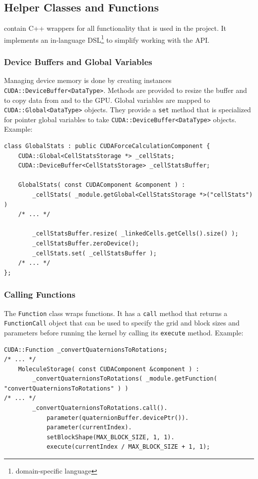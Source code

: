 \subsection{\cuda{} Helper Classes and Functions}
 contain C++ wrappers for all \cuda{} functionality that is used in the project.
It implements an in-language DSL\footnote{domain-specific language} to simplify working with the \cuda{} API.


\subsubsection{Device Buffers and Global Variables}
Managing device memory is done by creating instances \lstinline!CUDA::DeviceBuffer<DataType>!. Methods are provided to resize the buffer and to copy data from and to the GPU.
Global variables are mapped to \lstinline!CUDA::Global<DataType>! objects. They provide a \lstinline!set! method that is specialized for pointer global variables to take \lstinline!CUDA::DeviceBuffer<DataType>! objects.
Example:
\begin{lstlisting}[label=cudamemoryhelpers,caption=CUDA helper classes for Device Memory and Globals]
class GlobalStats : public CUDAForceCalculationComponent {
	CUDA::Global<CellStatsStorage *> _cellStats;
	CUDA::DeviceBuffer<CellStatsStorage> _cellStatsBuffer;
	
	GlobalStats( const CUDAComponent &component ) :
		_cellStats( _module.getGlobal<CellStatsStorage *>("cellStats") )
	/* ... */
	
		_cellStatsBuffer.resize( _linkedCells.getCells().size() );
		_cellStatsBuffer.zeroDevice();
		_cellStats.set( _cellStatsBuffer );		
	/* ... */		
};	
\end{lstlisting}

\subsubsection{Calling \cuda{} Functions}
The \lstinline!Function! class wraps \cuda{} functions. It has a \lstinline!call! method that returns a \lstinline!FunctionCall! object that can be used to specify the grid and block sizes and parameters before running the \cuda{} kernel by calling its \lstinline!execute! method.
Example:
\begin{lstlisting}[label=cudafunctionhelpers,caption=CUDA helper classes for Function Calls]
	CUDA::Function _convertQuaternionsToRotations;
/* ... */		
	MoleculeStorage( const CUDAComponent &component ) :
		_convertQuaternionsToRotations( _module.getFunction( "convertQuaternionsToRotations" ) )
/* ... */
		_convertQuaternionsToRotations.call().
			parameter(quaternionBuffer.devicePtr()).
			parameter(currentIndex).
			setBlockShape(MAX_BLOCK_SIZE, 1, 1).
			execute(currentIndex / MAX_BLOCK_SIZE + 1, 1);
\end{lstlisting}

